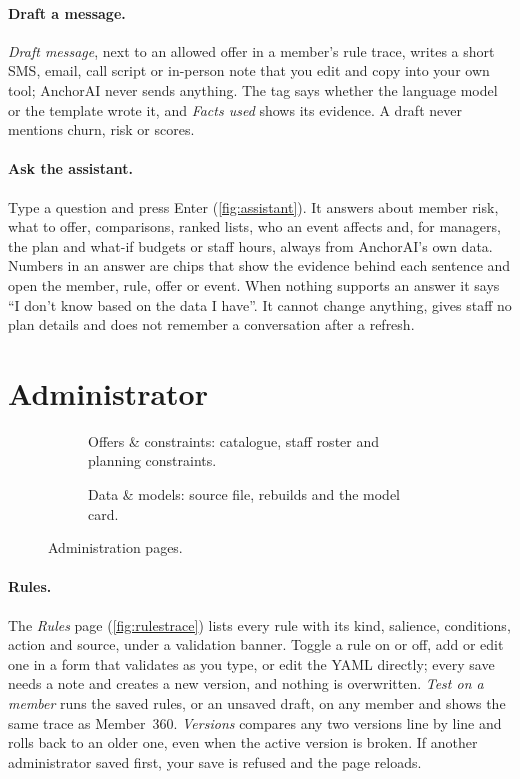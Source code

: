 \paragraph{Draft a message.} \emph{Draft message}, next to an allowed offer in a member's rule trace, writes a short SMS, email, call script or in-person note that you edit and copy into your own tool; AnchorAI never sends anything. The tag says whether the language model or the template wrote it, and \emph{Facts used} shows its evidence. A draft never mentions churn, risk or scores.

\paragraph{Ask the assistant.} Type a question and press Enter (\cref{fig:assistant}). It answers about member risk, what to offer, comparisons, ranked lists, who an event affects and, for managers, the plan and what-if budgets or staff hours, always from AnchorAI's own data. Numbers in an answer are chips that show the evidence behind each sentence and open the member, rule, offer or event. When nothing supports an answer it says \enquote{I don't know based on the data I have}. It cannot change anything, gives staff no plan details and does not remember a conversation after a refresh.

\section{Administrator}

\begin{figure}[tb]
  \centering
  \begin{subfigure}[t]{0.495\linewidth}
    \caption{Offers \& constraints: catalogue, staff roster and planning constraints.}
  \end{subfigure}\hfill
  \begin{subfigure}[t]{0.495\linewidth}
    \caption{Data \& models: source file, rebuilds and the model card.}
    \label{fig:ug-data}
  \end{subfigure}
  \caption{Administration pages.}
\end{figure}

\paragraph{Rules.} The \emph{Rules} page (\cref{fig:rulestrace}) lists every rule with its kind, salience, conditions, action and source, under a validation banner. Toggle a rule on or off, add or edit one in a form that validates as you type, or edit the YAML directly; every save needs a note and creates a new version, and nothing is overwritten. \emph{Test on a member} runs the saved rules, or an unsaved draft, on any member and shows the same trace as Member~360. \emph{Versions} compares any two versions line by line and rolls back to an older one, even when the active version is broken. If another administrator saved first, your save is refused and the page reloads.

